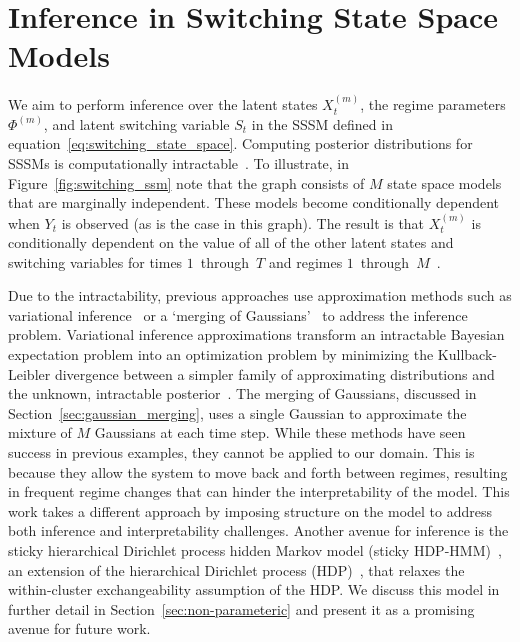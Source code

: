 \section{Inference in Switching State Space Models}\label{sec:inference_for_sssm}
We aim to perform inference over the latent states $X_t^{(m)}$, the regime parameters $\Phi^{(m)}$, and latent switching variable $S_t$ in the SSSM defined in equation~\ref{eq:switching_state_space}. Computing posterior distributions for SSSMs is computationally intractable~\citep{murphy2002dynamic, kim1994dynamic}. To illustrate, in Figure~\ref{fig:switching_ssm} note that the graph consists of $M$ state space models that are marginally independent. These models become conditionally dependent when $Y_t$ is observed (as is the case in this graph). The result is that $X_t^{(m)}$ is conditionally dependent on the value of all of the other latent states and switching variables for times $1$~through~$T$ and regimes $1$~through~$M$~\citep{murphy2002dynamic,ghahramani2000variational}.

Due to the intractability, previous approaches use approximation methods such as variational inference~\citep{ghahramani2000variational} or a `merging of Gaussians'~\citep{kim1999state,murphy2002dynamic} to address the inference problem. Variational inference approximations transform an intractable Bayesian expectation problem into an optimization problem by minimizing the Kullback-Leibler divergence between a simpler family of approximating distributions and the unknown, intractable posterior~\citep{attias2000variational,saul1996exploiting,saul1996mean,blei2003latent}. The merging of Gaussians, discussed in Section~\ref{sec:gaussian_merging}, uses a single Gaussian to approximate the mixture of $M$ Gaussians at each time step. While these methods have seen success in previous examples, they cannot be applied to our domain. This is because they allow the system to move back and forth between regimes, resulting in frequent regime changes that can hinder the interpretability of the model. This work takes a different approach by imposing structure on the model to address both inference and interpretability challenges. Another avenue for inference is the sticky hierarchical Dirichlet process hidden Markov model (sticky HDP-HMM)~\citep{fox2009nonparametric,fox2007hierarchical}, an extension of the hierarchical Dirichlet process (HDP)~\citep{teh2005sharing}, that relaxes the within-cluster exchangeability assumption of the HDP. We discuss this model in further detail in Section~\ref{sec:non-parameteric} and present it as a promising avenue for future work.



